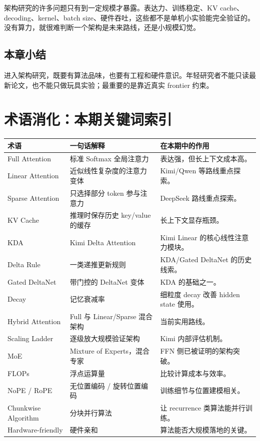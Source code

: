 \documentclass[a4paper]{article}
\begin{document}
架构研究的许多问题只有到一定规模才暴露。表达力、训练稳定、KV cache、decoding、kernel、batch size、硬件吞吐，这些都不是单机小实验能完全验证的。没有算力，就很难判断一个架构是未来路线，还是小规模幻觉。

\subsection{本章小结}

进入架构研究，既要有算法品味，也要有工程和硬件意识。年轻研究者不能只读最新论文，也不能只做玩具实验；最重要的是靠近真实 frontier 约束。

\section{术语消化：本期关键词索引}

\begin{longtable}{p{}p{}p{}}
\toprule
术语 & 一句话解释 & 在本期中的作用 \\
\midrule
Full Attention & 标准 Softmax 全局注意力 & 表达强，但长上下文成本高。 \\
Linear Attention & 近似线性复杂度的注意力变体 & Kimi/Qwen 等路线重点探索。 \\
Sparse Attention & 只选择部分 token 参与注意力 & DeepSeek 路线重点探索。 \\
KV Cache & 推理时保存历史 key/value 的缓存 & 长上下文显存瓶颈。 \\
KDA & Kimi Delta Attention & Kimi Linear 的核心线性注意力模块。 \\
Delta Rule & 一类递推更新规则 & KDA/Gated DeltaNet 的历史线索。 \\
Gated DeltaNet & 带门控的 DeltaNet 变体 & KDA 的基础之一。 \\
Decay & 记忆衰减率 & 细粒度 decay 改善 hidden state 使用。 \\
Hybrid Attention & Full 与 Linear/Sparse 混合架构 & 当前实用路线。 \\
Scaling Ladder & 逐级放大规模验证架构 & Kimi 内部评估机制。 \\
MoE & Mixture of Experts，混合专家 & FFN 侧已被证明的架构突破。 \\
FLOPs & 浮点运算量 & 比较计算成本与效率。 \\
NoPE / RoPE & 无位置编码 / 旋转位置编码 & 训练细节与位置建模相关。 \\
Chunkwise Algorithm & 分块并行算法 & 让 recurrence 类算法能并行训练。 \\
Hardware-friendly & 硬件亲和 & 算法能否大规模落地的关键。 \\
\bottomrule
\end{longtable}
\end{document}
